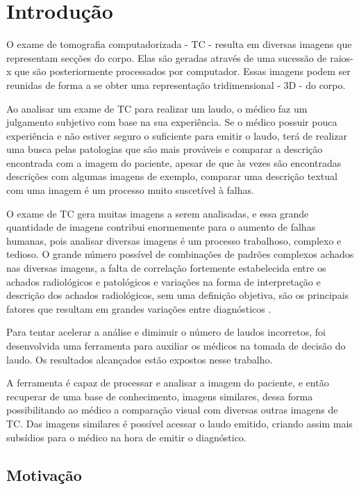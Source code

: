 \chapter{Introdução}

O exame de tomografia computadorizada - TC - resulta em diversas imagens que representam secções do corpo. Elas são geradas através de uma sucessão de raios-x que são posteriormente processados por computador. Essas imagens podem ser reunidas de forma a se obter uma representação tridimensional - 3D - do corpo.

Ao analisar um exame de TC para realizar um laudo, o médico faz um julgamento subjetivo com base na sua experiência. Se o médico possuir pouca experiência e não estiver seguro o suficiente para emitir o laudo, terá de realizar uma busca pelas patologias que são mais prováveis e comparar a descrição encontrada com a imagem do paciente, apesar de que às vezes são encontradas descrições com algumas imagens de exemplo, comparar uma descrição textual com uma imagem é um processo muito suscetível à falhas.

O exame de TC gera muitas imagens a serem analisadas, e essa grande quantidade de imagens contribui enormemente para o aumento de falhas humanas, pois analisar diversas imagens é um processo trabalhoso, complexo e tedioso. O grande número possível de combinações de padrões complexos achados nas diversas imagens, a falta de correlação fortemente estabelecida entre os achados radiológicos e patológicos e variações na forma de interpretação e descrição dos achados radiológicos, sem uma definição objetiva, são os principais fatores que resultam em grandes variações entre diagnósticos \cite{uchiyama}.

Para tentar acelerar a análise e diminuir o número de laudos incorretos, foi desenvolvida uma ferramenta para auxiliar os médicos na tomada de decisão do laudo. Os resultados alcançados estão expostos nesse trabalho.

A ferramenta é capaz de processar e analisar a imagem do paciente, e então recuperar de uma base de conhecimento, imagens similares, dessa forma possibilitando ao médico a comparação visual com diversas outras imagens de TC. Das imagens similares é possível acessar o laudo emitido, criando assim mais subsídios para o médico na hora de emitir o diagnóstico.

\section{Motivação}

